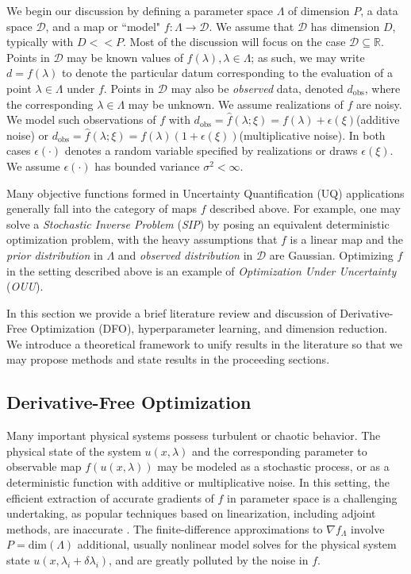 \documentclass{amsart}
\begin{document}
We begin our discussion by defining a parameter space $\Lambda$ of dimension $P$,  a data space $\mathcal{D}$, and a  map or ``model" $f: \Lambda \rightarrow \mathcal{D}$.
We assume that $\mathcal{D}$ has dimension $D$, typically with $D<< P$. Most of the discussion will focus on the case $\mathcal{D} \subseteq \mathbb{R}$. 
Points in $\mathcal{D}$ may be known values of $f(\lambda), \lambda\in \Lambda$; as such, we may write $d=f(\lambda)$ to denote the particular datum corresponding to the evaluation of a point $\lambda \in \Lambda$ under $f$. 
Points in $\mathcal{D}$ may also be \textit{observed} data, denoted $d_{\text{obs}}$, where the corresponding $\lambda\in \Lambda$ may be unknown. 
We assume realizations of $f$ are  noisy. We model such observations of $f$ with $d_{\text{obs}}=\hat{f}(\lambda;\xi)=f(\lambda)+\epsilon(\xi)$(additive noise)  or $d_{\text{obs}}=\hat{f}(\lambda;\xi)=f(\lambda)(1+\epsilon(\xi))$(multiplicative noise). In both cases $\epsilon(\cdot)$ denotes a random variable specified by realizations or draws $\epsilon(\xi)$. We assume $\epsilon(\cdot)$ has bounded variance $\sigma^2<\infty$.


Many objective functions formed in Uncertainty Quantification (UQ) applications generally fall into the category of maps $f$ described above. For example, one may solve a \textit{Stochastic Inverse Problem} (\textit{SIP}) by posing an equivalent deterministic optimization problem, with the heavy assumptions that $f$ is a linear map and the \textit{prior distribution} in $\Lambda$ and \textit{observed distribution} in $\mathcal{D}$ are Gaussian. Optimizing $f$ in the setting described above is an example  of \textit{Optimization Under Uncertainty} (\textit{OUU}).

In this section we provide a brief literature review and discussion of Derivative-Free Optimization (DFO), hyperparameter learning, and dimension reduction. We introduce a theoretical framework to unify results in the literature so that we may propose methods and state results in the proceeding sections.




\subsection{Derivative-Free Optimization}

Many important physical systems possess turbulent or chaotic behavior.  The physical state of the system $u(x,\lambda)$ and the corresponding parameter
to observable map $f(u(x,\lambda))$ may be modeled as a stochastic process, or as a deterministic function with additive or multiplicative noise.  
In this setting, the efficient extraction of accurate gradients of $f$ in parameter space is a challenging undertaking, as popular techniques based on
linearization, including adjoint methods, are inaccurate \cite{lea2000, Qiqi2014}.  
The finite-difference approximations to $\nabla f_\Lambda$ 
involve  $P=\text{dim}(\Lambda)$ 
additional, usually nonlinear model solves for the physical system state $u(x,\lambda_i + \delta \lambda_i)$, and are greatly polluted by the noise in $f$.
\end{document}
